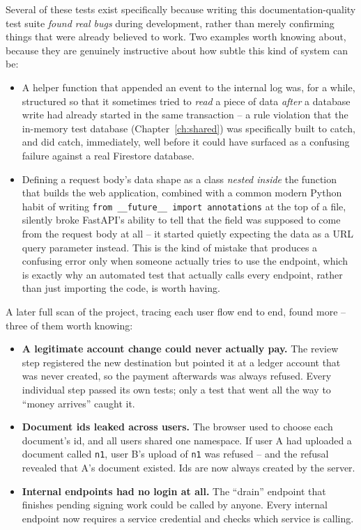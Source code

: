 \documentclass[11pt]{report}
\newcommand{\code}[1]{\texttt{#1}}
\begin{document}
\begin{whyitmatters}
Several of these tests exist specifically because writing this
documentation-quality test suite \emph{found real bugs} during
development, rather than merely confirming things that were already
believed to work. Two examples worth knowing about, because they are
genuinely instructive about how subtle this kind of system can be:

\begin{itemize}[leftmargin=2em]
\item A helper function that appended an event to the internal log was,
      for a while, structured so that it sometimes tried to \emph{read}
      a piece of data \emph{after} a database write had already started
      in the same transaction -- a rule violation that the in-memory
      test database (Chapter~\ref{ch:shared}) was specifically built to
      catch, and did catch, immediately, well before it could have
      surfaced as a confusing failure against a real Firestore database.
\item Defining a request body's data shape as a class \emph{nested
      inside} the function that builds the web application, combined
      with a common modern Python habit of writing
      \code{from \_\_future\_\_ import annotations} at the top of a
      file, silently broke FastAPI's ability to tell that the field was
      supposed to come from the request body at all -- it started
      quietly expecting the data as a URL query parameter instead. This
      is the kind of mistake that produces a confusing error only when
      someone actually tries to use the endpoint, which is exactly why
      an automated test that actually calls every endpoint, rather than
      just importing the code, is worth having.
\end{itemize}

A later full scan of the project, tracing each user flow end to end,
found more -- three of them worth knowing:

\begin{itemize}[leftmargin=2em]
\item \textbf{A legitimate account change could never actually pay.} The
      review step registered the new destination but pointed it at a
      ledger account that was never created, so the payment afterwards was
      always refused. Every individual step passed its own tests; only a
      test that went all the way to ``money arrives'' caught it.
\item \textbf{Document ids leaked across users.} The browser used to
      choose each document's id, and all users shared one namespace. If
      user A had uploaded a document called \code{n1}, user B's upload of
      \code{n1} was refused -- and the refusal revealed that A's document
      existed. Ids are now always created by the server.
\item \textbf{Internal endpoints had no login at all.} The ``drain''
      endpoint that finishes pending signing work could be called by
      anyone. Every internal endpoint now requires a service credential
      and checks which service is calling.
\end{itemize}
\end{whyitmatters}
\end{document}
